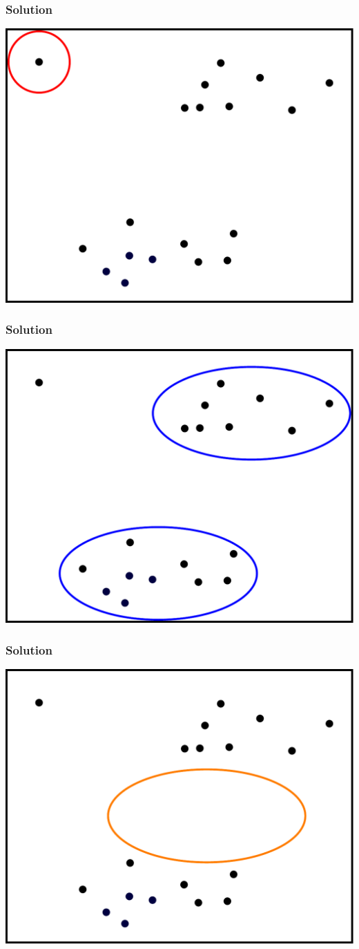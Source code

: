 \documentclass[bigger, aspectratio=169]{beamer}
\begin{document}
\begin{frame}
	\frametitle{Solution}
	\begin{center}
		\includegraphics[width=0.65\linewidth]{figures/similarity_visualization_outlier}
	\end{center}
\end{frame}

\begin{frame}
	\frametitle{Solution}
	\begin{center}
		\includegraphics[width=0.65\linewidth]{figures/similarity_visualization_clusters}
	\end{center}
\end{frame}

\begin{frame}
	\frametitle{Solution}
	\begin{center}
		\includegraphics[width=0.65\linewidth]{figures/similarity_visualization_gap}
	\end{center}
\end{frame}
\end{document}
